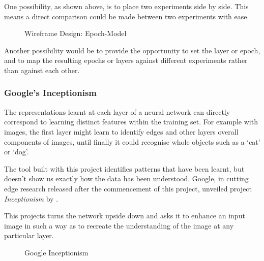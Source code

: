 \documentclass[a4paper,11pt,titlepage]{article}
\begin{document}
	One possibility, as shown above, is to place two experiments side by side. This means a direct comparison could be made between two experiments with ease.
	
	\begin{figure}[H]
    			\caption{Wireframe Design: Epoch-Model}%
	\end{figure}	
	
	Another possibility would be to provide the opportunity to set the layer or epoch, and to map the resulting epochs or layers against different experiments rather than against each other.	
	
\subsubsection{Google's Inceptionism}
	The representations learnt at each layer of a neural network can directly correspond to learning distinct features within the training set. For example with images, the first layer might learn to identify edges and other layers overall components of images, until finally it could recognise whole objects such as a `cat' or `dog'. 
	\par 
	The tool built with this project identifies patterns that have been learnt, but doesn't show us exactly how the data has been understood. Google, in cutting edge research released after the commencement of this project, unveiled project \textit{Inceptionism} by \cite{Mordvintsev2015}.
	\par 
	This projects turns the network upside down and asks it to enhance an input image in such a way as to recreate the understanding of the image at any particular layer.
	
	\begin{figure}[H]
    			\caption{Google Inceptionism}%
	\end{figure}	
	
\end{document}
